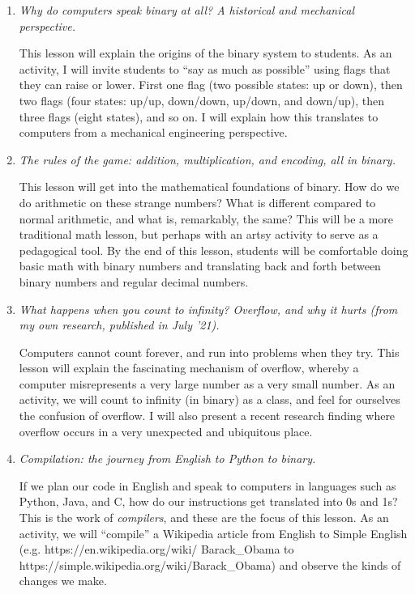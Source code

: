 \begin{enumerate}
  \item \emph{Why do computers speak binary at all? A historical and mechanical perspective.}

  This lesson will explain the origins of the binary system to students.
  As an activity, I will invite students to ``say as much as possible'' using flags that they can raise or lower.
  First one flag (two possible states: up or down), then two flags (four states: up/up, down/down, up/down, and down/up), then three flags (eight states), and so on.
  I will explain how this translates to computers from a mechanical engineering perspective.

  \item \emph{The rules of the game: addition, multiplication, and encoding, all in binary.}

  This lesson will get into the mathematical foundations of binary.
  How do we do arithmetic on these strange numbers?
  What is different compared to normal arithmetic, and what is, remarkably, the same?
  This will be a more traditional math lesson, but perhaps with an artsy activity to serve as a pedagogical tool.
  By the end of this lesson, students will be comfortable doing basic math with binary numbers and translating back and forth between binary numbers and regular decimal numbers.

  \item \emph{What happens when you count to infinity? Overflow, and why it hurts (from my own research, published in July '21).}

  Computers cannot count forever, and run into problems when they try.
  This lesson will explain the fascinating mechanism of overflow, whereby a computer misrepresents a very large number as a very small number.
  As an activity, we will count to infinity (in binary) as a class, and feel for ourselves the confusion of overflow.
  I will also present a recent research finding where overflow occurs in a very unexpected and ubiquitous place.

  \item \emph{Compilation: the journey from English to Python to binary.}

  If we plan our code in English and speak to computers in languages such as Python, Java, and C, how do our instructions get translated into 0s and 1s?
  This is the work of \emph{compilers}, and these are the focus of this lesson.
  As an activity, we will ``compile'' a Wikipedia article from English to Simple English (e.g. https://en.wikipedia.org/wiki/ Barack\_Obama to https://simple.wikipedia.org/wiki/Barack\_Obama) and observe the kinds of changes we make.


\end{enumerate}

